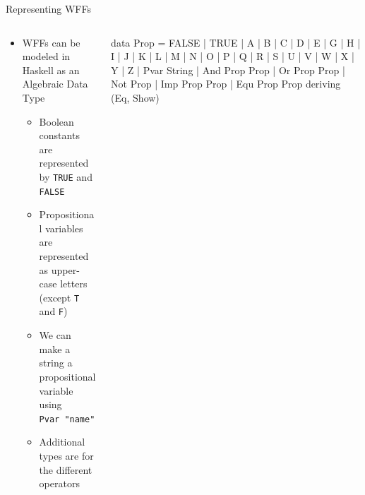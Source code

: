 \documentclass[11pt,t,pdf,xcolor=svgnames,aspectratio=169]{beamer}
\newenvironment{Shaded}{\begin{snugshade}}{\end{snugshade}}
\newcommand{\DataTypeTok}[1]{\textcolor[rgb]{0.87,0.87,0.75}{#1}}
\newcommand{\KeywordTok}[1]{\textcolor[rgb]{0.94,0.87,0.69}{#1}}
\newcommand{\NormalTok}[1]{\textcolor[rgb]{0.80,0.80,0.80}{#1}}
\newcommand{\OperatorTok}[1]{\textcolor[rgb]{0.94,0.94,0.82}{#1}}
\newcommand{\OtherTok}[1]{\textcolor[rgb]{0.94,0.94,0.56}{#1}}
\providecommand{\tightlist}{%
  \setlength{\itemsep}{5pt}\setlength{\parskip}{0pt}}
\begin{document}
\begin{frame}[fragile]{Representing WFFs}
\protect\hypertarget{representing-wffs}{}
\begin{columns}[T]
\begin{column}{0.48\textwidth}
\begin{itemize}
\tightlist
\item
  WFFs can be modeled in Haskell as an Algebraic Data Type

  \begin{itemize}
  \tightlist
  \item
    Boolean constants are represented by \texttt{TRUE} and
    \texttt{FALSE}
  \item
    Propositional variables are represented as upper-case letters
    (except \texttt{T} and \texttt{F})
  \item
    We can make a string a propositional variable using
    \texttt{Pvar\ "name"}
  \item
    Additional types are for the different operators
  \end{itemize}
\end{itemize}
\end{column}

\begin{column}{0.48\textwidth}
\begin{Shaded}
\begin{Highlighting}[]
\KeywordTok{data} \DataTypeTok{Prop}
  \OtherTok{=} \DataTypeTok{FALSE}
  \OperatorTok{|} \DataTypeTok{TRUE}
  \OperatorTok{|} \DataTypeTok{A} \OperatorTok{|} \DataTypeTok{B} \OperatorTok{|} \DataTypeTok{C} \OperatorTok{|} \DataTypeTok{D} \OperatorTok{|} \DataTypeTok{E} \OperatorTok{|} \DataTypeTok{G} \OperatorTok{|} \DataTypeTok{H} \OperatorTok{|} \DataTypeTok{I} \OperatorTok{|} \DataTypeTok{J} \OperatorTok{|} \DataTypeTok{K} \OperatorTok{|} \DataTypeTok{L} \OperatorTok{|} \DataTypeTok{M}
  \OperatorTok{|} \DataTypeTok{N} \OperatorTok{|} \DataTypeTok{O} \OperatorTok{|} \DataTypeTok{P} \OperatorTok{|} \DataTypeTok{Q} \OperatorTok{|} \DataTypeTok{R} \OperatorTok{|} \DataTypeTok{S} \OperatorTok{|} \DataTypeTok{U} \OperatorTok{|} \DataTypeTok{V} \OperatorTok{|} \DataTypeTok{W} \OperatorTok{|} \DataTypeTok{X} \OperatorTok{|} \DataTypeTok{Y} \OperatorTok{|} \DataTypeTok{Z}
  \OperatorTok{|} \DataTypeTok{Pvar} \DataTypeTok{String}
  \OperatorTok{|} \DataTypeTok{And} \DataTypeTok{Prop} \DataTypeTok{Prop}
  \OperatorTok{|} \DataTypeTok{Or} \DataTypeTok{Prop} \DataTypeTok{Prop}
  \OperatorTok{|} \DataTypeTok{Not} \DataTypeTok{Prop}
  \OperatorTok{|} \DataTypeTok{Imp} \DataTypeTok{Prop} \DataTypeTok{Prop}
  \OperatorTok{|} \DataTypeTok{Equ} \DataTypeTok{Prop} \DataTypeTok{Prop}
  \KeywordTok{deriving}\NormalTok{ (}\DataTypeTok{Eq}\NormalTok{, }\DataTypeTok{Show}\NormalTok{)}
\end{Highlighting}
\end{Shaded}
\end{column}
\end{columns}
\end{frame}
\end{document}
